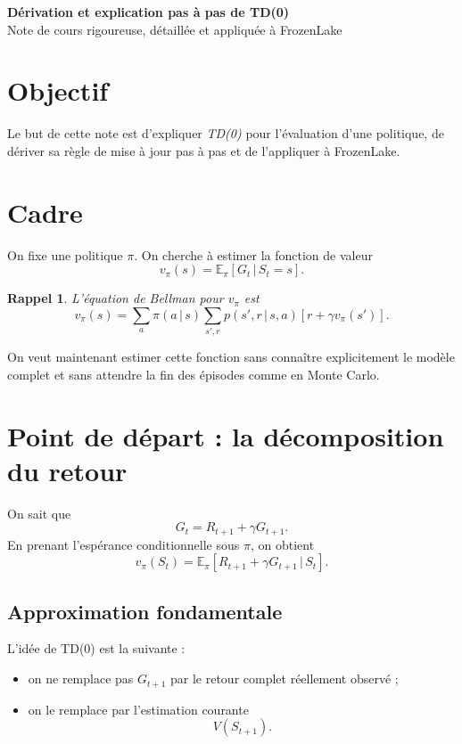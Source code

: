 \documentclass[11pt,a4paper]{article}
\newtheorem*{rappel}{Rappel}
\newcommand{\E}{\mathbb{E}}
\newcommand{\given}{\,|\,}
\begin{document}
\begin{center}
    {\LARGE\bfseries Dérivation et explication pas à pas de TD(0)}\\[0.4em]
    {\large Note de cours rigoureuse, détaillée et appliquée à FrozenLake}
\end{center}

\vspace{0.6em}

\section{Objectif}

Le but de cette note est d'expliquer \emph{TD(0)} pour l'évaluation d'une politique, de dériver sa règle de mise à jour pas à pas et de l'appliquer à FrozenLake.

\section{Cadre}

On fixe une politique $\pi$. On cherche à estimer la fonction de valeur
\[
v_{\pi}(s)=\E_{\pi}[G_t \given S_t=s].
\]

\begin{rappel}
L'équation de Bellman pour $v_{\pi}$ est
\[
v_{\pi}(s)=\sum_a \pi(a\given s)\sum_{s',r} p(s',r\given s,a)\left[r+\gamma v_{\pi}(s')\right].
\]
\end{rappel}

On veut maintenant estimer cette fonction sans connaître explicitement le modèle complet et sans attendre la fin des épisodes comme en Monte Carlo.

\section{Point de départ : la décomposition du retour}

On sait que
\[
G_t = R_{t+1}+\gamma G_{t+1}.
\]
En prenant l'espérance conditionnelle sous $\pi$, on obtient
\[
v_{\pi}(S_t)=\E_{\pi}[R_{t+1}+\gamma G_{t+1}\given S_t].
\]

\subsection{Approximation fondamentale}

L'idée de TD(0) est la suivante :
\begin{itemize}[leftmargin=1.6em]
    \item on ne remplace pas $G_{t+1}$ par le retour complet réellement observé ;
    \item on le remplace par l'estimation courante
    \[
    V(S_{t+1}).
    \]
\end{itemize}
\end{document}

